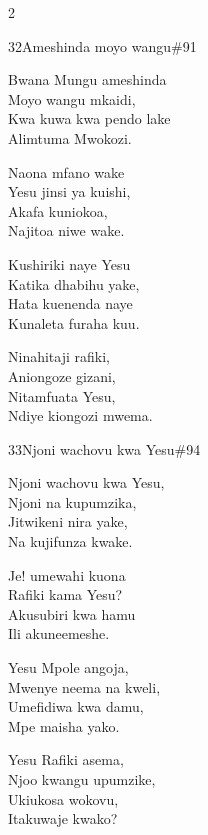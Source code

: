 \begin{multicols}{2}
\begin{hymn}{32}{Ameshinda moyo wangu}{\#91}
\begin{stanza}
Bwana Mungu ameshinda\\
Moyo wangu mkaidi,\\
Kwa kuwa kwa pendo lake\\
Alimtuma Mwokozi.
\end{stanza}
\begin{chorus}
Naona mfano wake\\
Yesu jinsi ya kuishi,\\
Akafa kuniokoa,\\
Najitoa niwe wake.
\end{chorus}
\begin{stanza}
Kushiriki naye Yesu\\
Katika dhabihu yake,\\
Hata kuenenda naye\\
Kunaleta furaha kuu.
\end{stanza}
\begin{stanza}
Ninahitaji rafiki,\\
Aniongoze gizani,\\
Nitamfuata Yesu,\\
Ndiye kiongozi mwema.
\end{stanza}
\end{hymn}

\begin{hymn}{33}{Njoni wachovu kwa Yesu}{\#94}
\begin{stanza}
Njoni wachovu kwa Yesu,\\
Njoni na kupumzika,\\
Jitwikeni nira yake,\\
Na kujifunza kwake.
\end{stanza}
\begin{chorus}
Je! umewahi kuona\\
Rafiki kama Yesu?\\
Akusubiri kwa hamu\\
Ili akuneemeshe.
\end{chorus}
\begin{stanza}
Yesu Mpole angoja,\\
Mwenye neema na kweli,\\
Umefidiwa kwa damu,\\
Mpe maisha yako.
\end{stanza}
\begin{stanza}
Yesu Rafiki asema,\\
Njoo kwangu upumzike,\\
Ukiukosa wokovu,\\
Itakuwaje kwako?
\end{stanza}
\end{hymn}


\end{multicols}
